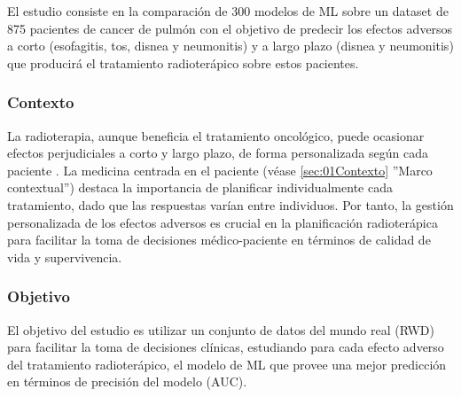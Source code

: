 El estudio consiste en la comparación de 300 modelos de ML sobre un dataset de 875 pacientes de cancer de pulmón con el objetivo de predecir los efectos adversos a corto (esofagitis, tos, disnea y neumonitis) y a largo plazo (disnea y neumonitis) que producirá el tratamiento radioterápico sobre estos pacientes. 

\subsubsection{Contexto}


La radioterapia, aunque beneficia el tratamiento oncológico, puede ocasionar efectos perjudiciales a corto y largo plazo, de forma personalizada según cada paciente \cite{nunez2019comparison, nunez2023benchmarking}. La medicina centrada en el paciente (véase \ref{sec:01Contexto} ''Marco contextual'') destaca la importancia de planificar individualmente cada tratamiento, dado que las respuestas varían entre individuos. Por tanto, la gestión personalizada de los efectos adversos es crucial en la planificación radioterápica para facilitar la toma de decisiones médico-paciente en términos de calidad de vida y supervivencia.

\subsubsection{Objetivo}

El objetivo del estudio es utilizar un conjunto de datos del mundo real (RWD) para facilitar la toma de decisiones clínicas, estudiando para cada efecto adverso del tratamiento radioterápico, el modelo de ML que provee una mejor predicción en términos de precisión del modelo (AUC).

